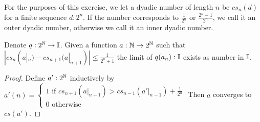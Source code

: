 For the purposes of this exercise, we let a dyadic number of length $n$ be 
$cs_n(d)$ for a finite sequence $d:2^n$. 
If the number corresponds to $\frac{1}{2^n}$ or $\frac{2^n-1}{2^n}$, we call it an outer dyadic number, 
otherwise we call it an inner dyadic number. 

\begin{lemma}
  Denote $q:2^{\mathbb{N}} \to \mathbb{I}$. 
  Given a function $a:\mathbb{N} \to 2^{\mathbb{N}}$ such that 
  $|cs_n(a|_n) - cs_{n+1}(a|_{n+1})|\leq \frac{1}{2^n+1}$ 
  the limit of $q(a_n):\mathbb{I}$ exists as number in $\mathbb{I}$. 
\end{lemma}
\begin{proof}
  Define $a':2^{\mathbb{N}}$ inductively by 
  $a'(n) = \begin{cases}
    1 \text{ if } cs_{n+1}(a|_{n+1}) > cs_{n-1}(a'|_{n-1}) + \frac{1}{2^{n}}
    \\ 
    0 \text{ otherwise}
  \end{cases}
  $
  Then $a$ converges to $cs (a')$. 
\end{proof}


